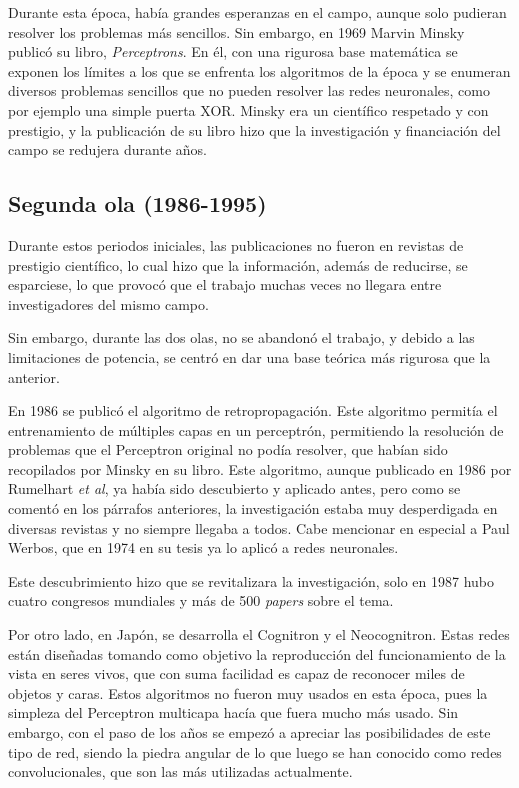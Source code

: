 \documentclass[12pt]{book}
\numberwithin{equation}{section}
\begin{document}
Durante esta época, había grandes esperanzas en el campo, aunque solo pudieran resolver los problemas más sencillos. Sin embargo, en 1969 Marvin Minsky publicó su libro, \textit{Perceptrons}\cite{minsky}. En él, con una rigurosa base matemática se exponen los límites a los que se enfrenta los algoritmos de la época y se enumeran diversos problemas sencillos que no pueden resolver las redes neuronales, como por ejemplo una simple puerta XOR. Minsky era un científico respetado y con prestigio, y la publicación de su libro hizo que la investigación y financiación del campo se redujera durante años.
\subsection{Segunda ola (1986-1995)}
Durante estos periodos iniciales, las publicaciones no fueron en revistas de prestigio científico, lo cual hizo que la información, además de reducirse, se esparciese, lo que provocó que el trabajo muchas veces no llegara entre investigadores del mismo campo.

Sin embargo, durante las dos olas, no se abandonó el trabajo, y debido a las limitaciones de potencia, se centró en dar una base teórica más rigurosa que la anterior.

En 1986 se publicó el algoritmo de retropropagación. Este algoritmo permitía el entrenamiento de múltiples capas en un perceptrón, permitiendo la resolución de problemas que el Perceptron original no podía resolver, que habían sido recopilados por Minsky en su libro. Este algoritmo, aunque publicado en 1986 por Rumelhart \textit{et al}\cite{Rumelhart:1988:LRB:65669.104451}, ya había sido descubierto y aplicado antes, pero como se comentó en los párrafos anteriores, la investigación estaba muy desperdigada en diversas revistas y no siempre llegaba a todos. Cabe mencionar en especial a Paul Werbos, que en 1974 en su tesis ya lo aplicó a redes neuronales\cite{werbos}. 

Este descubrimiento hizo que se revitalizara la investigación, solo en 1987 hubo cuatro congresos mundiales y más de 500 \textit{papers} sobre el tema.

Por otro lado, en Japón, se desarrolla el Cognitron y el Neocognitron. Estas redes están diseñadas tomando como objetivo la reproducción del funcionamiento de la vista en seres vivos, que con suma facilidad es capaz de reconocer miles de objetos y caras. Estos algoritmos no fueron muy usados en esta época, pues la simpleza del Perceptron multicapa hacía que fuera mucho más usado. Sin embargo, con el paso de los años se empezó a apreciar las posibilidades de este tipo de red, siendo la piedra angular de lo que luego se han conocido como redes convolucionales, que son las más utilizadas actualmente.
\end{document}
